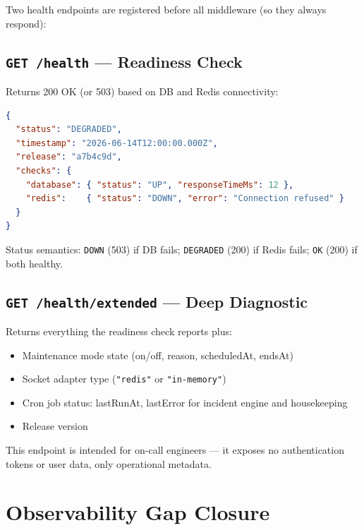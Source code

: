 \documentclass[11pt,a4paper,twoside]{book}
\begin{document}
Two health endpoints are registered before all middleware (so they always respond):

\subsection{\texttt{GET /health} — Readiness Check}

Returns 200 OK (or 503) based on DB and Redis connectivity:

\begin{lstlisting}[language=json,caption={/health response when degraded}]
{
  "status": "DEGRADED",
  "timestamp": "2026-06-14T12:00:00.000Z",
  "release": "a7b4c9d",
  "checks": {
    "database": { "status": "UP", "responseTimeMs": 12 },
    "redis":    { "status": "DOWN", "error": "Connection refused" }
  }
}
\end{lstlisting}

Status semantics: \texttt{DOWN} (503) if DB fails; \texttt{DEGRADED} (200) if
Redis fails; \texttt{OK} (200) if both healthy.

\subsection{\texttt{GET /health/extended} — Deep Diagnostic}

Returns everything the readiness check reports plus:

\begin{itemize}[leftmargin=1.4em,nosep]
  \item Maintenance mode state (on/off, reason, scheduledAt, endsAt)
  \item Socket adapter type (\texttt{"redis"} or \texttt{"in-memory"})
  \item Cron job status: lastRunAt, lastError for incident engine and housekeeping
  \item Release version
\end{itemize}

This endpoint is intended for on-call engineers — it exposes no authentication
tokens or user data, only operational metadata.

\section{Observability Gap Closure}
\end{document}
